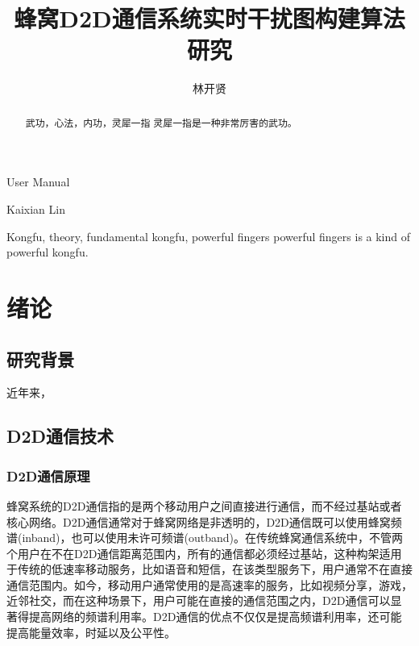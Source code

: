 \documentclass[figurelist,tablelist,algorithmlist,nomlist,masters]{seuthesix}
\begin{document}
	\title{蜂窝D2D通信系统实时干扰图构建算法研究}{}{ User Manual}{}
	\author{林开贤}{Kaixian Lin}
	\authorizedate{\today}
	
	\makecover
	\begin{abstract}{武功，心法，内功，灵犀一指}
		灵犀一指是一种非常厉害的武功。
	\end{abstract}
	
	\begin{englishabstract}{Kongfu, theory, fundamental kongfu, powerful fingers}
		powerful fingers is a kind of powerful kongfu.
	\end{englishabstract}
	
	\tableofcontents
	\listofothers
	
	\mainmatter
	
	\chapter{绪论}
	\section{研究背景}
	近年来， 
	\section{D2D通信技术}
	\subsection{D2D通信原理}
	蜂窝系统的D2D通信指的是两个移动用户之间直接进行通信，而不经过基站或者核心网络。D2D通信通常对于蜂窝网络是非透明的，D2D通信既可以使用蜂窝频谱(inband)，也可以使用未许可频谱(outband)。在传统蜂窝通信系统中，不管两个用户在不在D2D通信距离范围内，所有的通信都必须经过基站，这种构架适用于传统的低速率移动服务，比如语音和短信，在该类型服务下，用户通常不在直接通信范围内。如今，移动用户通常使用的是高速率的服务，比如视频分享，游戏，近邻社交，而在这种场景下，用户可能在直接的通信范围之内，D2D通信可以显著得提高网络的频谱利用率。D2D通信的优点不仅仅是提高频谱利用率，还可能提高能量效率，时延以及公平性。
	
\end{document}
